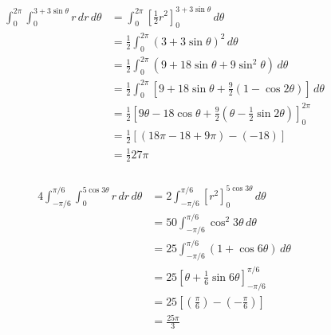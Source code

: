 \documentclass{article}
\begin{document}
\begin{align*}
  \int_0^{2 \pi} \int_0^{3 + 3 \sin \theta} r \,dr \,d\theta & = \int_0^{2 \pi} \left[ \frac{1}{2} r^2 \right]_0^{3 + 3 \sin \theta} \,d\theta                                                  \\
                                                             & = \frac{1}{2} \int_0^{2 \pi} (3 + 3 \sin \theta)^2 \,d\theta                                                                     \\
                                                             & = \frac{1}{2} \int_0^{2 \pi} (9 + 18 \sin \theta + 9 \sin^2 \theta) \,d\theta                                                    \\
                                                             & = \frac{1}{2} \int_0^{2 \pi} \left[ 9 + 18 \sin \theta + \frac{9}{2} (1 - \cos 2 \theta) \right] \,d\theta                       \\
                                                             & = \frac{1}{2} \left[ 9 \theta - 18 \cos \theta + \frac{9}{2} \left( \theta - \frac{1}{2} \sin 2 \theta \right) \right]_0^{2 \pi} \\
                                                             & = \frac{1}{2} [(18 \pi - 18 + 9 \pi) - (-18)]                                                                                    \\
                                                             & = \frac{1}{2} 27 \pi
\end{align*}

\setcounter{subsubsection}{4}
\subsubsection{}

\begin{align*}
  4 \int_{-\pi / 6}^{\pi / 6} \int_0^{5 \cos 3 \theta} r \,dr \,d\theta & = 2 \int_{-\pi / 6}^{\pi / 6} [r^2]_0^{5 \cos 3 \theta} \,d\theta                \\
                                                                        & = 50 \int_{-\pi / 6}^{\pi / 6} \cos^2 3 \theta \,d\theta                         \\
                                                                        & = 25 \int_{-\pi / 6}^{\pi / 6} (1 + \cos 6 \theta) \,d\theta                     \\
                                                                        & = 25 \left[ \theta + \frac{1}{6} \sin 6 \theta \right]_{-\pi / 6}^{\pi / 6}      \\
                                                                        & = 25 \left[ \left( \frac{\pi}{6} \right) - \left( -\frac{\pi}{6} \right) \right] \\
                                                                        & = \frac{25 \pi}{3}
\end{align*}
\end{document}
